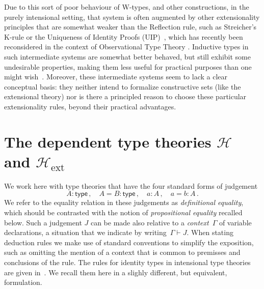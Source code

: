 \documentclass[11pt]{article}
\newcommand{\type}{\mathsf{type}}
\newcommand{\Hint}{\mathcal{H}}
\newcommand{\Hext}{\mathcal{H}_{\mathrm{ext}}}
\theoremstyle{definition}
\begin{document}
Due to this sort of poor behaviour of W-types, and other constructions, in the purely intensional setting, that system is often augmented by other extensionality principles that are somewhat weaker than the Reflection rule, such as Streicher's K-rule  or the Uniqueness of Identity Proofs (UIP)~\cite{StreicherT:invitt}, which has recently been reconsidered
in the context of Observational Type Theory \cite{AltenkirchT:obsen}.  Inductive types in such intermediate systems are somewhat better behaved, but still exhibit some undesirable properties, making them less useful for practical purposes than one might wish~\cite{McBrideC:wtygnb}.  Moreover, these intermediate systems seem to lack a clear conceptual basis:  they neither intend to formalize constructive sets (like the extensional theory) nor is there a principled reason to choose these particular extensionality rules, beyond their practical advantages.  

\newpage


\section{The dependent type theories $\Hint$ and $\Hext$}
\label{section:prelim}


We work here with type theories that have the four standard forms of judgement
\[
A : \type \, , \quad A = B : \type \, , \quad   a : A \, , \quad a = b : A \, . 
\]
We refer to the equality relation in these judgements as \emph{definitional equality}, 
which should be contrasted with the notion of \emph{propositional equality}
recalled below. 
Such a judgement $J$ can be made also relative to a \emph{context}~$\Gamma$ of variable declarations, a situation that we indicate by writing~$\Gamma \vdash J$. When stating deduction
rules we make use of standard conventions to simplify the exposition, such as omitting the mention
of a context that is common to premisses and conclusions of the rule.
The rules for identity types in intensional type theories are given in~\cite[Section~5.5]{NordstromB:marltt}. We recall them here in a slighly different, but equivalent, formulation.
\end{document}
